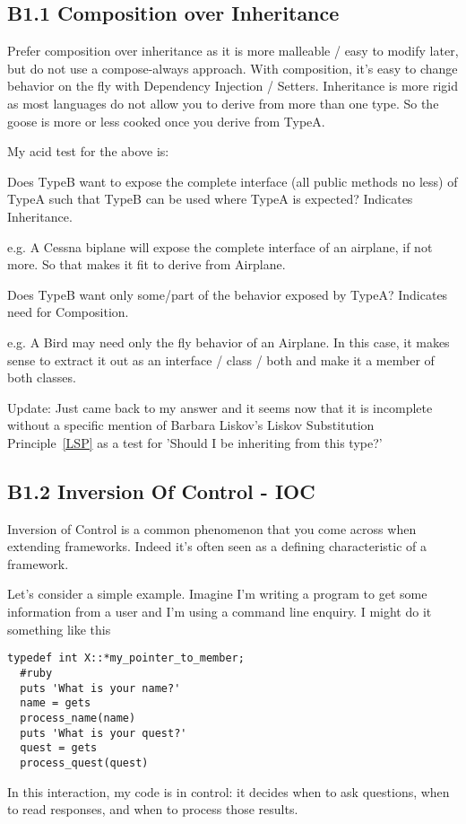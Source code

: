 \documentclass{book}
\begin{document}
\subsection{B1.1 Composition over Inheritance}\label{copi}

Prefer composition over inheritance as it is more malleable / easy to modify later, but do not use a compose-always approach.
With composition, it's easy to change behavior on the fly with Dependency Injection / Setters.
Inheritance is more rigid as most languages do not allow you to derive from more than one type.
So the goose is more or less cooked once you derive from TypeA.

My acid test for the above is:

    Does TypeB want to expose the complete interface (all public methods no less) of TypeA such that TypeB can be used where TypeA is expected? Indicates Inheritance.

e.g. A Cessna biplane will expose the complete interface of an airplane, if not more. So that makes it fit to derive from Airplane.

    Does TypeB want only some/part of the behavior exposed by TypeA? Indicates need for Composition.

e.g. A Bird may need only the fly behavior of an Airplane. In this case, it makes sense to extract it out as an interface / class / both and make it a member of both classes.

Update: Just came back to my answer and it seems now that it is incomplete without a specific mention of Barbara Liskov's Liskov Substitution Principle~\ref{LSP}
as a test for 'Should I be inheriting from this type?'


\subsection{B1.2 Inversion Of Control - IOC}\label{IOC}
Inversion of Control is a common phenomenon that you come across when extending frameworks. Indeed it's often seen as a defining characteristic of a framework.

Let's consider a simple example. Imagine I'm writing a program to get some information from a user and I'm using a command line enquiry. I might do it something like this

\begin{lstlisting}
typedef int X::*my_pointer_to_member;
  #ruby
  puts 'What is your name?'
  name = gets
  process_name(name)
  puts 'What is your quest?'
  quest = gets
  process_quest(quest)
\end{lstlisting}
In this interaction, my code is in control: it decides when to ask questions, when to read responses, and when to process those results.
\end{document}
